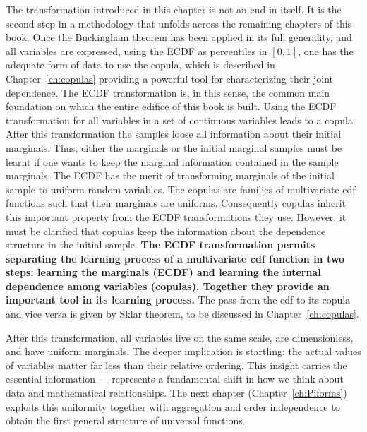 The transformation introduced in this chapter is not an end in itself. It is the
second step in a methodology that unfolds across the remaining chapters of this book.
Once the Buckingham theorem has been applied in its full generality, and all variables are expressed, using the ECDF as percentiles in $[0,1]$, one has the adequate form of data to use the copula, which is described in Chapter~\ref{ch:copulas} providing a powerful tool for characterizing their joint dependence. The ECDF transformation is, in this sense, the common main foundation on which the entire edifice of this book is built. Using the ECDF transformation for all variables in a set of continuous variables leads to a copula. After this transformation the samples loose all information about their initial marginals. Thus, either the marginals or the initial marginal samples must be learnt if one wants to keep the marginal information contained in the sample marginals. The ECDF has the merit of transforming marginals of the initial sample to uniform random variables. The copulas are families of multivariate cdf functions such that their marginals are uniforms. Consequently copulas inherit this important property from the ECDF transformations they use. However, it must be clarified that copulas keep the information about the dependence structure in the initial sample. \textbf{The ECDF transformation permits separating the learning process of a multivariate cdf function in two steps: learning the marginals (ECDF) and learning the internal dependence among variables (copulas). Together they provide an important tool in its learning process.} The pass from the cdf to its copula and vice versa is given by Sklar theorem, to be discussed in Chapter~\ref{ch:copulas}.

After this transformation, all variables live on the same scale, are dimensionless, and have uniform marginals. The deeper implication is startling: the actual values of variables matter far less than their relative ordering. This insight carries the essential information — represents a fundamental shift in how we think about data and mathematical relationships. The next chapter (Chapter~\ref{ch:Piforms}) exploits this uniformity together with aggregation and order independence to obtain the first general structure of universal functions. 